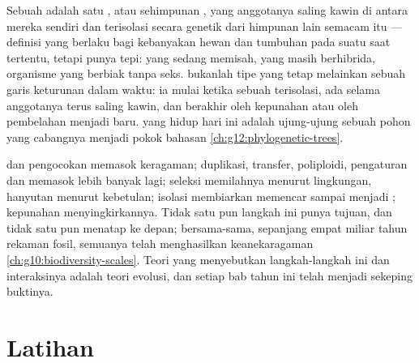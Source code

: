 \begin{proposition}\label{prop:g12:selection-drift-speciation:concept}
Sebuah  adalah satu , atau sehimpunan , yang
anggotanya saling kawin di antara mereka sendiri dan terisolasi secara
genetik dari himpunan lain semacam itu --- definisi yang berlaku bagi
kebanyakan hewan dan tumbuhan pada suatu saat tertentu, tetapi punya
tepi:  yang sedang memisah,  yang masih berhibrida,
organisme yang berbiak tanpa seks.  bukanlah tipe yang tetap
melainkan sebuah garis keturunan dalam waktu: ia mulai ketika sebuah
 terisolasi, ada selama anggotanya terus saling kawin, dan
berakhir oleh kepunahan atau oleh pembelahan menjadi  baru.
 yang hidup hari ini adalah ujung-ujung sebuah pohon yang
cabangnya menjadi pokok bahasan \cref{ch:g12:phylogenetic-trees}.
\end{proposition}
\admitted

\begin{remark}\label{rem:g12:selection-drift-speciation:assembled}
 dan pengocokan memasok keragaman; duplikasi, transfer,
poliploidi, pengaturan dan  memasok lebih banyak lagi;
seleksi memilahnya menurut lingkungan, hanyutan menurut kebetulan;
isolasi membiarkan  memencar sampai menjadi ; kepunahan
menyingkirkannya. Tidak satu pun langkah ini punya tujuan, dan tidak
satu pun menatap ke depan; bersama-sama, sepanjang empat miliar tahun
rekaman fosil, semuanya telah menghasilkan keanekaragaman
\cref{ch:g10:biodiversity-scales}. Teori yang menyebutkan
langkah-langkah ini dan interaksinya adalah teori evolusi, dan setiap
bab tahun ini telah menjadi sekeping buktinya.
\end{remark}

\section{Latihan}

